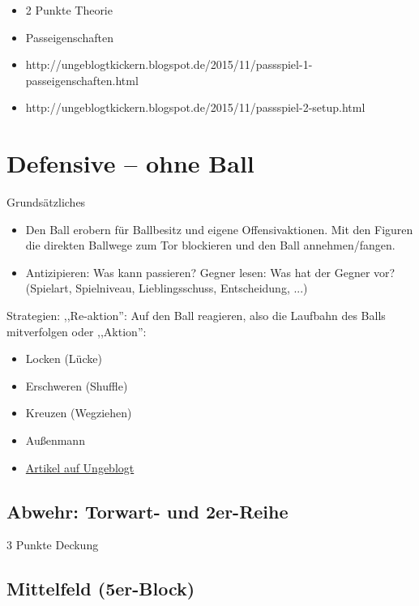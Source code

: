 \begin{itemize}
\item 2 Punkte Theorie
\item Passeigenschaften
\item http://ungeblogtkickern.blogspot.de/2015/11/passspiel-1-passeigenschaften.html
\item http://ungeblogtkickern.blogspot.de/2015/11/passspiel-2-setup.html
\end{itemize}


\section{Defensive -- ohne Ball}
\label{taktik:defensive}

Grundsätzliches
\begin{itemize}
\item Den Ball erobern für Ballbesitz und eigene Offensivaktionen. Mit den Figuren die direkten Ballwege zum Tor blockieren und den Ball annehmen/fangen. 
\item Antizipieren: Was kann passieren? Gegner lesen: Was hat der Gegner vor? (Spielart, Spielniveau, Lieblingsschuss, Entscheidung, ...)
\end{itemize}

Strategien:
,,Re-aktion'': Auf den Ball reagieren, also die Laufbahn des Balls mitverfolgen oder ,,Aktion'':
\begin{itemize}
\item Locken (Lücke)
\item Erschweren (Shuffle)
\item Kreuzen (Wegziehen)
\item Außenmann 
\item \href{http://ungeblogtkickern.blogspot.de/2015/06/defensivbewegungen-im-verteidigerbereich.html}{Artikel auf Ungeblogt}
\end{itemize}


\subsection{Abwehr: Torwart- und 2er-Reihe}
\label{taktik:defensive:halten}

3 Punkte Deckung


\subsection{Mittelfeld (5er-Block)}
\label{taktik:defensive:5erblock}

